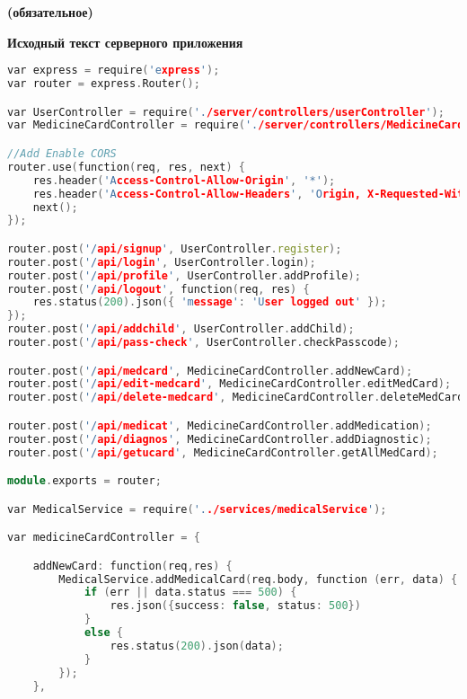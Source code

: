 \begin{center}
\vspace{-1em}
\textbf{ (обязательное)}

\textbf{Исходный текст серверного приложения}
\end{center}


\begin{lstlisting}[language=C++, style=cplusplusstyle]
var express = require('express');
var router = express.Router();

var UserController = require('./server/controllers/userController');
var MedicineCardController = require('./server/controllers/MedicineCardController');

//Add Enable CORS
router.use(function(req, res, next) {
    res.header('Access-Control-Allow-Origin', '*');
    res.header('Access-Control-Allow-Headers', 'Origin, X-Requested-With, Content-Type, Accept');
    next();
});

router.post('/api/signup', UserController.register);
router.post('/api/login', UserController.login);
router.post('/api/profile', UserController.addProfile);
router.post('/api/logout', function(req, res) {
    res.status(200).json({ 'message': 'User logged out' });
});
router.post('/api/addchild', UserController.addChild);
router.post('/api/pass-check', UserController.checkPasscode);

router.post('/api/medcard', MedicineCardController.addNewCard);
router.post('/api/edit-medcard', MedicineCardController.editMedCard);
router.post('/api/delete-medcard', MedicineCardController.deleteMedCard);

router.post('/api/medicat', MedicineCardController.addMedication);
router.post('/api/diagnos', MedicineCardController.addDiagnostic);
router.post('/api/getucard', MedicineCardController.getAllMedCard);

module.exports = router;

var MedicalService = require('../services/medicalService');

var medicineCardController = {

    addNewCard: function(req,res) {
        MedicalService.addMedicalCard(req.body, function (err, data) {
            if (err || data.status === 500) {
                res.json({success: false, status: 500})
            }
            else {
                res.status(200).json(data);
            }
        });
    },


\end{lstlisting}

